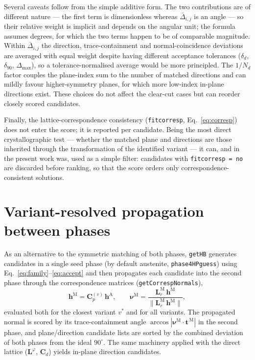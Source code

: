 \documentclass[11pt,a4paper]{article}
\newcommand{\mat}[1]{\mathbf{#1}}
\newcommand{\vc}[1]{\bm{#1}}
\begin{document}
Several caveats follow from the simple additive form. The two contributions are of different nature --- the first term is dimensionless whereas $\bar\Delta_{i,j}$ is an angle --- so their relative weight is implicit and depends on the angular unit; the formula assumes degrees, for which the two terms happen to be of comparable magnitude. Within $\bar\Delta_{i,j}$ the direction, trace-containment and normal-coincidence deviations are averaged with equal weight despite having different acceptance tolerances ($\delta_d$, $\delta_{90}$, $\Delta_{\max}$), so a tolerance-normalised average would be more principled. The $1/N_d$ factor couples the plane-index sum to the number of matched directions and can mildly favour higher-symmetry planes, for which more low-index in-plane directions exist. These choices do not affect the clear-cut cases but can reorder closely scored candidates.

Finally, the lattice-correspondence consistency (\texttt{fitcorresp}, Eq.~\eqref{eq:corresp}) does not enter the score; it is reported per candidate. Being the most direct crystallographic test --- whether the matched plane and directions are those inherited through the transformation of the identified variant --- it can, and in the present work was, used as a simple filter: candidates with \texttt{fitcorresp = no} are discarded before ranking, so that the score orders only correspondence-consistent solutions.

\section{Variant-resolved propagation between phases}

As an alternative to the symmetric matching of both phases, \texttt{getHB} generates candidates in a single seed phase (by default austenite, \texttt{phase4HPguess}) using Eq.~\eqref{eq:family}--\eqref{eq:accept} and then propagates each candidate into the second phase through the correspondence matrices (\texttt{getCorrespNormals}),
\begin{equation}
\vc h^{\mathrm M}=\mat C_p^{(v)}\,\vc h^{\mathrm A},
\qquad
\vc\nu^{\mathrm M}=\frac{\mat L_{r}^{\mathrm M}\,\vc h^{\mathrm M}}{\lVert \mat L_{r}^{\mathrm M}\,\vc h^{\mathrm M}\rVert},
\label{eq:propagate}
\end{equation}
evaluated both for the closest variant $v^\ast$ and for all variants. The propagated normal is scored by its trace-containment angle $\arccos|\vc\nu^{\mathrm M}\cdot\vc t^{\,\mathrm M}|$ in the second phase, and plane/direction candidate lists are sorted by the combined deviation of both phases from the ideal $90^\circ$. The same machinery applied with the direct lattice ($\mat L^{\varphi}$, $\mat C_d$) yields in-plane direction candidates.
\end{document}
